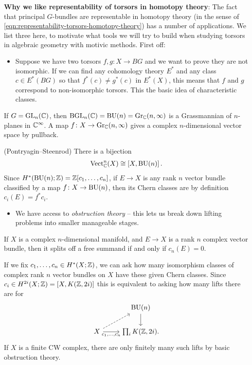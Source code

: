 \documentclass[11pt,openany]{book}
\begin{document}
\textbf{Why we like representability of torsors in homotopy theory}: The fact that principal $G$-bundles are representable in homotopy theory (in the sense of \autoref{eqn:representability-torsors-homotopy-theory}) has a number of applications. We list three here, to motivate what tools we will try to build when studying torsors in algebraic geometry with motivic methods.
First off:
\begin{itemize}
    \item Suppose we have two torsors $f,g \colon X\to BG$ and we want to prove they are not isomorphic. If we can find any cohomology theory $E^\ast$ and any class $c\in E^\ast(BG)$ so that $f^\ast(c) \ne g^\ast(c)$ in $E^\ast(X)$, this means that $f$ and $g$ correspond to non-isomorphic torsors. This the basic idea of characteristic classes.
\end{itemize}

\begin{example} If $G = \mathrm{GL}_n(\mathbb{C})$, then $\mathrm{BGL}_n(\mathbb{C}) = \mathrm{BU}(n) = \mathrm{Gr}_{\mathbb{C}}(n,\infty)$ is a Grassmannian of $n$-planes in $\mathbb{C}^\infty$. A map $f \colon X \to \mathrm{Gr}_{\mathbb{C}}(n,\infty)$ gives a complex $n$-dimensional vector space by pullback.
\end{example}

\begin{theorem} (Pontryagin--Steenrod) There is a bijection
\begin{align*}
    \mathrm{Vect}_{\mathbb{C}}^n(X) \cong \left[ X, \mathrm{BU}(n) \right].
\end{align*}
Since $H^\ast(\mathrm{BU}(n);\mathbb{Z}) = \mathbb{Z}[c_1, \ldots, c_n]$, if $E \to X$ is any rank $n$ vector bundle classified by a map $f \colon X \to \mathrm{BU}(n)$, then its Chern classes are by definition $c_i(E) = f^\ast c_i$.
\end{theorem}

\begin{itemize}
    \item We have access to \textit{obstruction theory} -- this lets us break down lifting problems into smaller manageable stages.
\end{itemize}

\begin{example} If $X$ is a complex $n$-dimensional manifold, and $E \to X$ is a rank $n$ complex vector bundle, then it splits off a free summand if and only if $c_n(E) = 0$.
\end{example}

\begin{example} If we fix $c_1, \ldots, c_n \in H^{\ast}(X;\mathbb{Z})$, we can ask how many isomorphism classes of complex rank $n$ vector bundles on $X$ have these given Chern classes. Since $c_i \in H^{2i}(X;\mathbb{Z}) = \left[ X, K(\mathbb{Z},2i) \right]$ this is equivalent to asking how many lifts there are for
\[ \begin{tikzcd}
     & \BU(n)\dar\\
    X\ar[ur,dashed]\rar["{c_1, \ldots, c_n}" below] & {\prod_i K(\Z,2i)}.
\end{tikzcd} \]
If $X$ is a finite CW complex, there are only finitely many such lifts by basic obstruction theory.
\end{example}
\end{document}
